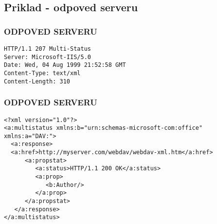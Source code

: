 \documentclass{beamer}
\begin{document}
\subsection{Priklad - odpoved serveru}
\begin{frame}[fragile]
\frametitle{ODPOVED SERVERU}
\begin{example}
\begin{verbatim}
HTTP/1.1 207 Multi-Status
Server: Microsoft-IIS/5.0
Date: Wed, 04 Aug 1999 21:52:58 GMT
Content-Type: text/xml
Content-Length: 310
   \end{verbatim}
\end{example}
\end{frame}
\begin{frame}[fragile]
\frametitle{ODPOVED SERVERU}
\begin{example}
\begin{verbatim}
<?xml version="1.0"?>
<a:multistatus xmlns:b="urn:schemas-microsoft-com:office"
xmlns:a="DAV:">
  <a:response>
  <a:href>http://myserver.com/webdav/webdav-xml.htm</a:href>
      <a:propstat>
         <a:status>HTTP/1.1 200 OK</a:status>
         <a:prop>
            <b:Author/>
         </a:prop>
      </a:propstat>
   </a:response>
</a:multistatus>
   \end{verbatim}
\end{example}
\end{frame}
\end{document}
